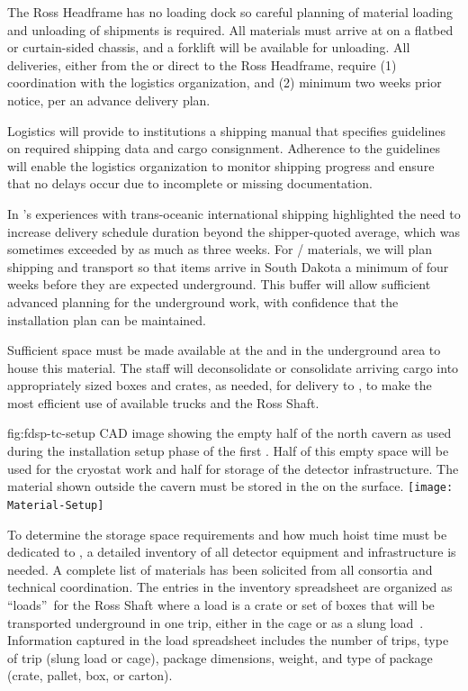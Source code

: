 The Ross Headframe has no loading dock so careful planning of material loading and unloading of shipments is required. 
All materials must arrive at  on a flatbed or curtain-sided chassis, and a forklift will be available for unloading. 
All deliveries, either from the  or direct to the Ross Headframe, require (1) coordination with the logistics organization, and (2) minimum two weeks prior notice, per an advance delivery plan.  
 
Logistics will provide to  institutions a shipping manual that  
specifies guidelines on required shipping data and cargo consignment. Adherence to the guidelines will enable the logistics organization to monitor shipping progress and ensure that no delays occur due to incomplete or missing documentation. 


In 's experiences with trans-oceanic international shipping highlighted the need to increase delivery schedule duration beyond the shipper-quoted average, which was sometimes exceeded by as much as three weeks. For / materials, we will plan shipping and transport so that items arrive in South Dakota a minimum of four weeks before they are expected underground. This buffer will allow sufficient advanced planning for the underground work, with confidence that the installation plan can be maintained.


Sufficient space must be made available at the  and in the underground area  to house this material.
The  staff will deconsolidate or consolidate arriving cargo into appropriately sized boxes and crates, as needed, for delivery to , to make the most efficient use of available trucks and the Ross Shaft. 

\begin{dunefigure}{fig:fdsp-tc-setup}
  {CAD image showing the empty half of the north cavern as used during the installation setup phase of the first .  Half of this empty space will be used for the cryostat work and half for storage of the detector infrastructure. The material shown outside the cavern must be stored in the  on the surface.}
\texttt{[image: Material-Setup]}
\end{dunefigure}


To determine the storage space requirements and how much hoist time must be dedicated to , a detailed inventory of all   detector equipment and infrastructure is needed. 
A complete list of materials has been solicited from all consortia and technical coordination. 
The entries in the inventory spreadsheet are organized as \textquotedblleft loads\textquotedblright \ for the Ross Shaft where a load is a crate or set of boxes that will be transported underground in one trip, either in the cage or as a slung load~\cite{bib:docdb8426}. 
Information captured in the load spreadsheet includes the number of  
trips, type of trip (slung load or cage), package dimensions, weight, and type of package (crate, pallet, box, or carton). 

